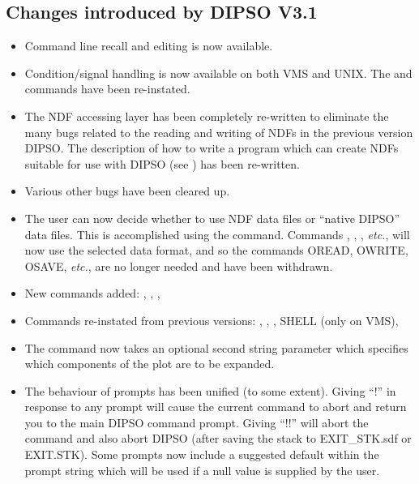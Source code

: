 \documentclass[twoside,11pt,noabs,nolof]{starlink}
\begin{document}
\subsection{Changes introduced by DIPSO V3.1}
\begin{itemize}

\item Command line recall and editing is now available.

\item Condition/signal handling is now available on both VMS and UNIX.
The   and   commands have been re-instated.

\item The NDF accessing layer has been completely re-written to
eliminate the many bugs related to the reading and writing of NDFs in
the previous version DIPSO. The description of how to write a program
which can create NDFs suitable for use with DIPSO (see
) has been re-written.

\item Various other bugs have been cleared up.

\item The user can now decide whether to use NDF data files or ``native
DIPSO'' data files. This is accomplished using the   command.
Commands ,  ,  ,  \emph{etc.}, will now use the selected data
format, and so the commands OREAD, OWRITE, OSAVE, \emph{etc.}, are no
longer needed and have been withdrawn.

\item New commands added: ,  ,  ,  

\item Commands re-instated from previous versions: ,  ,
,  SHELL (only on VMS),

\item The   command now takes an optional second string parameter
which specifies which components of the plot are to be expanded.

\item The behaviour of prompts has been unified (to some extent).
Giving ``!'' in response to any prompt will cause the current command to
abort and return you to the main DIPSO command prompt. Giving ``!!'' will
abort the command and also abort DIPSO (after saving the stack to
EXIT\_STK.sdf or EXIT.STK). Some prompts now include a suggested default
within the prompt string which will be used if a null value is supplied
by the user.


\end{itemize}
\end{document}
